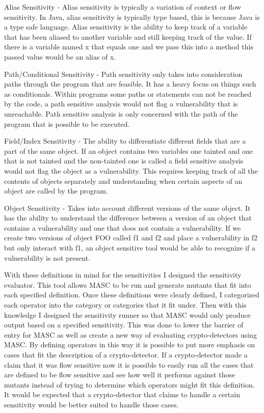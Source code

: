 Alias Sensitivity - Alias sensitivity is typically a variation of context or flow sensitivity. In Java, alias sensitivity is typically type based, this is because Java is a type safe language. Alias sensitivity is the ability to keep track of a variable that has been aliased to another variable and still keeping track of the value. If there is a variable named x that equals one and we pass this into a method this passed value would be an alias of x.

Path/Conditional Sensitivity - Path sensitivity only takes into consideration paths through the program that are feasible. It has a heavy focus on things such as conditionals. Within programs some paths or statements can not be reached by the code, a path sensitive analysis would not flag a vulnerability that is unreachable. Path sensitive analysis is only concerned with the path of the program that is possible to be executed.

Field/Index Sensitivity - The ability to differentiate different fields that are a part of the same object. If an object contains two variables one tainted and one that is not tainted and the non-tainted one is called a field sensitive analysis would not flag the object as a vulnerability. This requires keeping track of all the contents of objects separately and understanding when certain aspects of an object are called by the program.
    
Object Sensitivity - Takes into account different versions of the same object. It has the ability to understand the difference between a version of an object that contains a vulnerability and one that does not contain a vulnerability. If we create two versions of object FOO called f1 and f2 and place a vulnerability in f2 but only interact with f1, an object sensitive tool would be able to recognize if a vulnerability is not present.

With these definitions in mind for the sensitivities I designed the sensitivity evaluator. This tool allows MASC to be run and generate mutants that fit into each specified definition. Once these definitions were clearly defined, I categorized each operator into the category or categories that it fit under. Then with this knowledge I designed the sensitivity runner so that MASC would only produce output based on a specified sensitivity. This was done to lower the barrier of entry for MASC as well as create a new way of evaluating crypto-detectors using MASC. By defining operators in this way it is possible to put more emphasis on cases that fit the description of a crypto-detector. If a crypto-detector made a claim that it was flow sensitive now it is possible to easily run all the cases that are defined to be flow sensitive and see how well it performs against those mutants instead of trying to determine which operators might fit this definition. It would be expected that a crypto-detector that claims to handle a certain sensitivity would be better suited to handle those cases. 

